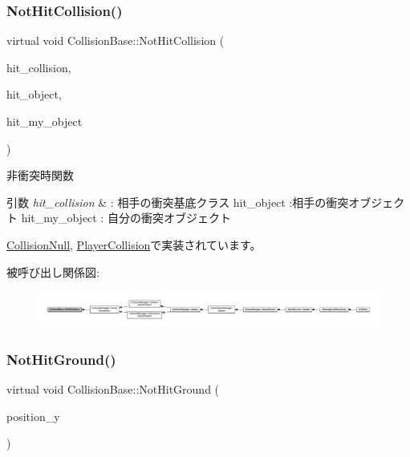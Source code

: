 \subsubsection{\texorpdfstring{Not\+Hit\+Collision()}{NotHitCollision()}}
{\footnotesize\ttfamily virtual void Collision\+Base\+::\+Not\+Hit\+Collision (\begin{DoxyParamCaption}\item[{\mbox{\hyperlink{class_collision_base}{Collision\+Base}} $\ast$}]{hit\+\_\+collision,  }\item[{\mbox{\hyperlink{class_collision_object}{Collision\+Object}} $\ast$}]{hit\+\_\+object,  }\item[{\mbox{\hyperlink{class_collision_object}{Collision\+Object}} $\ast$}]{hit\+\_\+my\+\_\+object }\end{DoxyParamCaption})\hspace{0.3cm}{\ttfamily [pure virtual]}}



非衝突時関数 


\begin{DoxyParams}{引数}
{\em hit\+\_\+collision} & \+: 相手の衝突基底クラス hit\+\_\+object \+:相手の衝突オブジェクト hit\+\_\+my\+\_\+object \+: 自分の衝突オブジェクト \\
\hline
\end{DoxyParams}


\mbox{\hyperlink{class_collision_null_aba2a574ab42dca618c41dd0b9562f614}{Collision\+Null}}, \mbox{\hyperlink{class_player_collision_a21b8f825ea142024212ab5fe3f427ab0}{Player\+Collision}}で実装されています。

被呼び出し関係図\+:
\nopagebreak
\begin{figure}[H]
\begin{center}
\leavevmode
\includegraphics[width=350pt]{class_collision_base_a9b64fc5c3f2aac2a05296985ef799fb1_icgraph}
\end{center}
\end{figure}
\mbox{\label{class_collision_base_ac1ed5b1c0c9b6b70b432e6656f9c4b45}} 
\subsubsection{\texorpdfstring{Not\+Hit\+Ground()}{NotHitGround()}}
{\footnotesize\ttfamily virtual void Collision\+Base\+::\+Not\+Hit\+Ground (\begin{DoxyParamCaption}\item[{float}]{position\+\_\+y }\end{DoxyParamCaption})\hspace{0.3cm}{\ttfamily [pure virtual]}}



